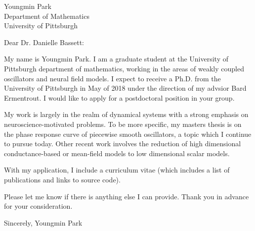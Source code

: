 \documentclass[a4paper,11pt]{letter}
\begin{document}
\begin{letter}{Youngmin Park \\ Department of Mathematics\\ University of Pittsburgh}
 

\opening{Dear Dr. Danielle Bassett:}

My name is Youngmin Park. I am a graduate student at the University of Pittsburgh department of mathematics, working in the areas of weakly coupled oscillators and neural field models. I expect to receive a Ph.D. from the University of Pittsburgh in May of 2018 under the direction of my advsior Bard Ermentrout. I would like to apply for a postdoctoral position in your group.

My work is largely in the realm of dynamical systems with a strong emphasis on neuroscience-motivated problems. To be more specific, my masters thesis is on the phase response curve of piecewise smooth oscillators, a topic which I continue to pursue today. Other recent work involves the reduction of high dimensional conductance-based or mean-field models to low dimensional scalar models.

With my application, I include a curriculum vitae (which includes a list of publications and links to source code).

Please let me know if there is anything else I can provide. Thank you in advance for your consideration.

Sincerely,
Youngmin Park
 
 
 
\end{letter}
\end{document}

